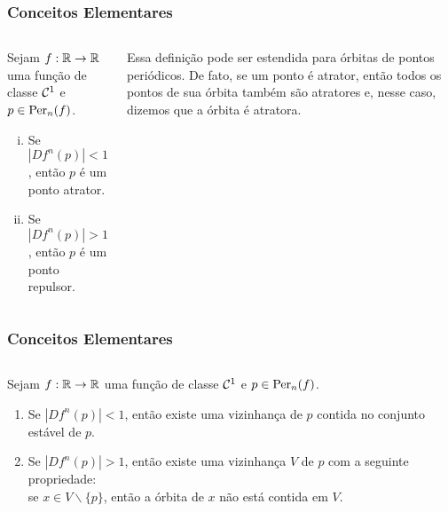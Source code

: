 \begin{frame}
\vspace{5pt}
\frametitle{Conceitos Elementares}
\begin{columns}
\column{\dimexpr\paperwidth-15pt}

\begin{definition}
Sejam $f: \mathbb{R} \to \mathbb{R}$ uma função de classe $\mathcal{C}^1$ e $p \in \operatorname{Per}_n(f)$.
\begin{enumerate}[i.]
\item Se $|D f^n(p)| < 1$, então $p$ é um ponto atrator.
\item Se $|D f^n(p)| > 1$, então $p$ é um ponto repulsor.
\end{enumerate}
\end{definition}

Essa definição pode ser estendida para órbitas de pontos periódicos. De fato, se um ponto é atrator, então todos os pontos de sua órbita também são atratores e, nesse caso, dizemos que a órbita é atratora.

\end{columns}
\end{frame}



\begin{frame}
\vspace{5pt}
\frametitle{Conceitos Elementares}
\begin{columns}
\column{\dimexpr\paperwidth-15pt}

\begin{theorem}
Sejam $f: \mathbb{R} \to \mathbb{R}$ uma função de classe $\mathcal{C}^1$ e $p \in \operatorname{Per}_n(f)$.
\begin{enumerate}
\item Se $|D f^n(p)| < 1$, então existe uma vizinhança de $p$ contida no conjunto estável de $p$.
\item Se $|D f^n(p)| > 1$, então existe uma vizinhança $V$ de $p$ com a seguinte propriedade:\\se $x \in V \backslash \lbrace p \rbrace$, então a órbita de $x$ não está contida em $V$. 
\end{enumerate}
\end{theorem}

\end{columns}
\end{frame}
